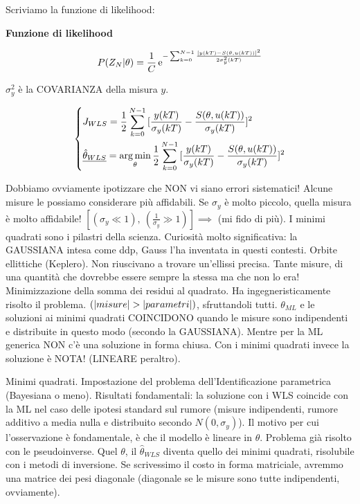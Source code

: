 Scriviamo la funzione di likelihood:

\begin{defn}{\textbf{Funzione di likelihood}}

\[
	P(Z_N|\theta) = \frac{1}{C}\mathop{}\!\mathrm{e}^{-\sum_{k=0}^{N-1}{\frac{[y(kT)-S(\theta,u(kT))]^2}{2\sigma_y^2(kT)}}}
\]

\end{defn}

$\sigma_y^2$ è la COVARIANZA della misura $y$.

\[
	\left\{
	\begin{aligned}
	&J_{WLS} = \frac{1}{2}\sum_{k=0}^{N-1}{[\frac{y(kT)}{\sigma_y(kT)} - \frac{S(\theta,u(kT))}{\sigma_y(kT)}]^2}\\
	&\underline{\hat{\theta}_{WLS}} = \operatorname*{arg\,min}_\theta{\frac{1}{2}\sum_{k=0}^{N-1}{[\frac{y(kT)}{\sigma_y(kT)} - \frac{S(\theta,u(kT))}{\sigma_y(kT)}]^2}}
	\end{aligned}
	\right.
\]

Dobbiamo ovviamente ipotizzare che NON vi siano errori sistematici! Alcune misure le possiamo considerare più affidabili. Se $\sigma_y$ è molto piccolo, quella misura è molto affidabile! $[(\sigma_y\ll 1),\ (\frac{1}{\sigma_y}\gg 1)] \implies$ (mi fido di più). I minimi quadrati sono i pilastri della scienza. Curiosità molto significativa: la GAUSSIANA intesa come ddp, Gauss l'ha inventata in questi contesti. Orbite ellittiche (Keplero). Non riuscivano a trovare un'ellissi precisa. Tante misure, di una quantità che dovrebbe essere sempre la stessa ma che non lo era! Minimizzazione della somma dei residui al quadrato. Ha ingegneristicamente risolto il problema. $(\left\vert{misure}\right\vert>\left\vert{parametri}\right\vert)$, sfruttandoli tutti. $\theta_{ML}$ e le soluzioni ai minimi quadrati COINCIDONO quando le misure sono indipendenti e distribuite in questo modo (secondo la GAUSSIANA). Mentre per la ML generica NON c'è una soluzione in forma chiusa. Con i minimi quadrati invece la soluzione è NOTA! (LINEARE peraltro).

Minimi quadrati. Impostazione del problema dell'Identificazione parametrica (Bayesiana o meno). Risultati fondamentali: la soluzione con i WLS coincide con la ML nel caso delle ipotesi standard sul rumore (misure indipendenti, rumore additivo a media nulla e distribuito secondo $N(0,\sigma_y)$). Il motivo per cui l'osservazione è fondamentale, è che il modello è lineare in $\theta$. Problema già risolto con le pseudoinverse. Quel $\theta$, il $\hat{\theta}_{WLS}$ diventa quello dei minimi quadrati, risolubile con i metodi di inversione. Se scrivessimo il costo in forma matriciale, avremmo una matrice dei pesi diagonale (diagonale se le misure sono tutte indipendenti, ovviamente).

